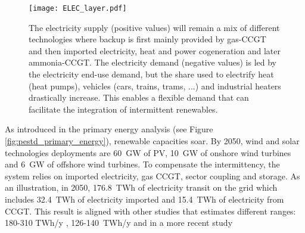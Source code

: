\begin{figure}[!htbp]
     \centering
         \texttt{[image: ELEC\_layer.pdf]}
         \caption{The electricity supply (positive values) will remain a mix of different technologies where backup is first mainly provided by gas-\gls{CCGT} and then imported electricity, heat and power cogeneration and later ammonia-\gls{CCGT}. The electricity demand (negative values) is led by the electricity end-use demand, but the share used to electrify heat (heat pumps), vehicles (cars, trains, trams, ...) and industrial heaters drastically increase. This enables a flexible demand that can facilitate the integration of intermittent renewables.}
         \label{fig:ELEC_layer}
\end{figure}

As introduced in the primary energy analysis (see Figure \ref{fig:pestd_primary_energy}), renewable capacities soar. By 2050, wind and solar technologies deployments are 60~GW of \gls{PV}, 10~GW of onshore wind turbines and 6~GW of offshore wind turbines. To compensate the intermittency, the system relies on imported electricity, gas \gls{CCGT}, sector coupling and storage. As an illustration, in 2050, 176.8~TWh of electricity transit on the grid which includes 32.4~TWh of electricity imported and 15.4~TWh of electricity from \gls{CCGT}. This result is aligned with other studies that estimates different ranges: 180-310 TWh/y \cite{Devogelaer2013}, 126-140~TWh/y \cite{My2050} and in a more recent study 
